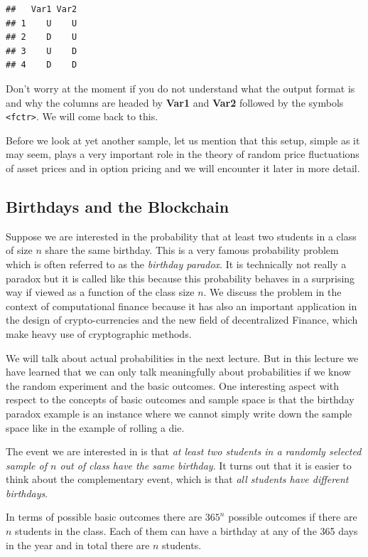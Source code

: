 \documentclass[
]{book}
\begin{document}
\begin{verbatim}
##   Var1 Var2
## 1    U    U
## 2    D    U
## 3    U    D
## 4    D    D
\end{verbatim}

Don't worry at the moment if you do not understand what the output
format is and why the columns are
headed by \textbf{Var1} and \textbf{Var2} followed by the symbols \texttt{\textless{}fctr\textgreater{}}. We will come back to this.

Before we look at yet another sample, let us mention that this setup, simple as it may
seem, plays a very important role in the theory of random price
fluctuations of asset prices and in
option pricing and we will encounter it later in more detail.

\hypertarget{birthdays-and-the-blockchain}{%
\subsection{Birthdays and the Blockchain}\label{birthdays-and-the-blockchain}}

Suppose we are interested in the probability that at least two students in a class
of size \(n\) share the same birthday. This is a very famous probability problem which
is often referred to as the \emph{birthday paradox}. It is technically not really a
paradox but it is called like this because this probability behaves in a surprising
way if viewed as a function of the class size \(n\). We discuss the problem in the
context of computational finance because it has also an important application in
the design of crypto-currencies and the new field of decentralized Finance, which
make heavy use of cryptographic methods.

We will talk about actual probabilities in the next lecture. But in
this lecture we have learned that we can only talk meaningfully about probabilities if
we know the random experiment and the basic outcomes. One interesting aspect with respect to
the concepts of basic outcomes and sample space is that the birthday paradox example is
an instance where we cannot simply write down the sample space like in the example of
rolling a die.

The event we are interested in is that
\emph{at least two students in a randomly selected sample of \(n\) out of class have the same birthday}.
It turns out that it is easier to think about the complementary event, which is that
\emph{all students have different birthdays}.

In terms of possible basic outcomes there
are \(365^n\) possible outcomes if there are \(n\) students in the class. Each of
them can have a birthday at any of the 365 days in the year and in total there are
\(n\) students.
\end{document}
